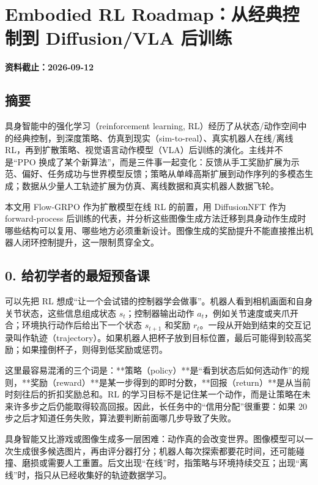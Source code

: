 \documentclass[
  chinese,
]{article}
\author{}
\date{}
\begin{document}
\section{Embodied RL Roadmap：从经典控制到 Diffusion/VLA
后训练}\label{embodied-rl-roadmapux4eceux7ecfux5178ux63a7ux5236ux5230-diffusionvla-ux540eux8badux7ec3}

\textbf{资料截止：2026-09-12}

\subsection{摘要}\label{ux6458ux8981}

具身智能中的强化学习（reinforcement learning,
RL）经历了从状态/动作空间中的经典控制，到深度策略、仿真到现实（sim-to-real）、真实机器人在线/离线
RL，再到扩散策略、视觉语言动作模型（VLA）后训练的演化。主线并不是``PPO
换成了某个新算法''，而是三件事一起变化：反馈从手工奖励扩展为示范、偏好、任务成功与世界模型反馈；策略从单峰高斯扩展到动作序列的多模态生成；数据从少量人工轨迹扩展为仿真、离线数据和真实机器人数据飞轮。

本文用 Flow-GRPO 作为扩散模型在线 RL 的前置，用 DiffusionNFT 作为
forward-process
后训练的代表，并分析这些图像生成方法迁移到具身动作生成时哪些结构可以复用、哪些地方必须重新设计。图像生成的奖励提升不能直接推出机器人闭环控制提升，这一限制贯穿全文。

\subsection{0.
给初学者的最短预备课}\label{0-ux7ed9ux521dux5b66ux8005ux7684ux6700ux77edux9884ux5907ux8bfe}

可以先把 RL
想成``让一个会试错的控制器学会做事''。机器人看到相机画面和自身关节状态，这些信息组成状态
\(s_t\)；控制器输出动作
\(a_t\)，例如关节速度或夹爪开合；环境执行动作后给出下一个状态
\(s_{t+1}\) 和奖励
\(r_t\)。一段从开始到结束的交互记录叫作轨迹（trajectory）。如果机器人把杯子放到目标位置，最后可能得到较高奖励；如果撞倒杯子，则得到低奖励或惩罚。

这里最容易混淆的三个词是：**策略（policy）**是``看到状态后如何选动作''的规则，**奖励（reward）**是某一步得到的即时分数，**回报（return）**是从当前时刻往后的折扣奖励总和。RL
的学习目标不是记住某一个动作，而是让策略在未来许多步之后仍能取得较高回报。因此，长任务中的``信用分配''很重要：如果
20 步之后才知道任务失败，算法要判断前面哪几步导致了失败。

具身智能又比游戏或图像生成多一层困难：动作真的会改变世界。图像模型可以一次生成很多候选图片，再由评分器打分；机器人每次探索都要花时间，还可能碰撞、磨损或需要人工重置。后文出现``在线''时，指策略与环境持续交互；出现``离线''时，指只从已经收集好的轨迹数据学习。
\end{document}
